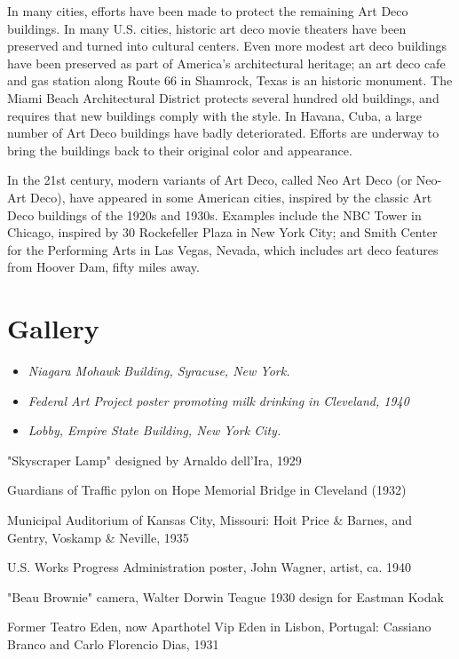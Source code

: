 In many cities, efforts have been made to protect the remaining Art Deco
buildings. In many U.S. cities, historic art deco movie theaters have
been preserved and turned into cultural centers. Even more modest art
deco buildings have been preserved as part of America's architectural
heritage; an art deco cafe and gas station along Route 66 in Shamrock,
Texas is an historic monument. The Miami Beach Architectural District
protects several hundred old buildings, and requires that new buildings
comply with the style. In Havana, Cuba, a large number of Art Deco
buildings have badly deteriorated. Efforts are underway to bring the
buildings back to their original color and appearance.

In the 21st century, modern variants of Art Deco, called Neo Art Deco
(or Neo-Art Deco), have appeared in some American cities, inspired by
the classic Art Deco buildings of the 1920s and 1930s. Examples include
the NBC Tower in Chicago, inspired by 30 Rockefeller Plaza in New York
City; and Smith Center for the Performing Arts in Las Vegas, Nevada,
which includes art deco features from Hoover Dam, fifty miles away.

\section{Gallery}\label{gallery}

\begin{itemize}
\item
  \emph{Niagara Mohawk Building, Syracuse, New York.}
\item
  \emph{Federal Art Project poster promoting milk drinking in Cleveland,
  1940}
\item
  \emph{Lobby, Empire State Building, New York City.}
\end{itemize}

"Skyscraper Lamp" designed by Arnaldo dell'Ira, 1929

Guardians of Traffic pylon on Hope Memorial Bridge in Cleveland (1932)

Municipal Auditorium of Kansas City, Missouri: Hoit Price \& Barnes, and
Gentry, Voskamp \& Neville, 1935

U.S. Works Progress Administration poster, John Wagner, artist, ca. 1940

"Beau Brownie" camera, Walter Dorwin Teague 1930 design for Eastman
Kodak

Former Teatro Eden, now Aparthotel Vip Eden in Lisbon, Portugal:
Cassiano Branco and Carlo Florencio Dias, 1931

